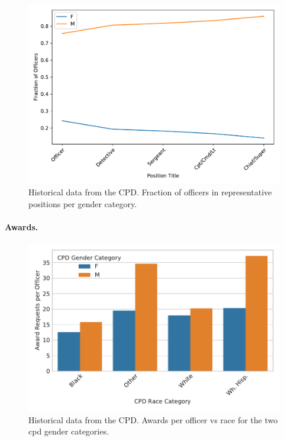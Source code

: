\begin{figure}[h] 
\includegraphics[width=\textwidth]{figs/position_gender} 
\caption{Historical data from the CPD. Fraction of officers in representative positions 
per gender category.} \label{fig:salary}
\end{figure}

\paragraph{Awards.}

\begin{figure}[h] 
\includegraphics[width=\textwidth]{figs/awards} 
\caption{Historical data from the CPD. Awards per officer vs race for the two cpd gender categories.} \label{fig:awards}
\end{figure}


